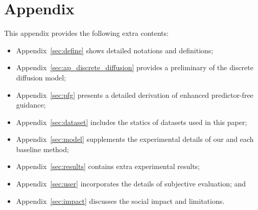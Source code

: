 
\setcounter{footnote}{0}
\setcounter{equation}{0}
\setcounter{table}{0}
\setcounter{figure}{0}

\renewcommand{\theequation}{A-\arabic{equation}}    
\renewcommand{\thetable}{A-\arabic{table}}    
\renewcommand{\thefigure}{A-\arabic{figure}}    

\section*{Appendix}
This appendix provides the following extra contents: 
\begin{itemize}
\item Appendix~\ref{sec:define} shows detailed notations and definitions; 
\item Appendix~\ref{sec:ap_discrete_diffusion} provides a preliminary of the discrete diffusion model; 
\item Appendix~\ref{sec:pfg} presents a detailed derivation of enhanced predictor-free guidance; 
\item Appendix~\ref{sec:dataset} includes the statics of datasets used in this paper;  \item Appendix~\ref{sec:model} supplements the experimental details of our \methodname
and each baseline method; 
\item Appendix~\ref{sec:results} contains extra experimental results; \item Appendix~\ref{sec:user} incorporates the details of subjective evaluation; and 
\item Appendix~\ref{sec:impact}  discusses the social impact and limitations.
\end{itemize}

